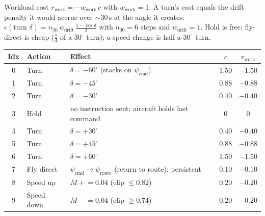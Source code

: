 \documentclass[11pt, a4paper]{article}
\begin{document}
Workload cost $r_\text{work}=-w_\text{work}\,c$ with $w_\text{work}=1$. A turn's cost equals the drift
penalty it would accrue over $\sim30$\,s at the angle it creates:
$c(\text{turn }\delta)=n_{30}\,w_\text{drift}\,\tfrac{1-\cos\delta}{2}$ with $n_{30}=6$ steps and
$w_\text{drift}=1$. Hold is free; fly-direct is cheap ($\tfrac14$ of a $30^\circ$ turn); a speed change
is half a $30^\circ$ turn.
\begin{table}[h]\centering
\begin{tabular}{cllcc}
\toprule
Idx & Action & Effect & $c$ & $r_\text{work}$\\
\midrule
0 & Turn       & $\delta=-60^\circ$ (stacks on $\psi_\text{cmd}$)              & $1.50$ & $-1.50$\\
1 & Turn       & $\delta=-45^\circ$                                            & $0.88$ & $-0.88$\\
2 & Turn       & $\delta=-30^\circ$                                            & $0.40$ & $-0.40$\\
3 & Hold       & no instruction sent; aircraft holds last command             & $0$    & $0$\\
4 & Turn       & $\delta=+30^\circ$                                            & $0.40$ & $-0.40$\\
5 & Turn       & $\delta=+45^\circ$                                            & $0.88$ & $-0.88$\\
6 & Turn       & $\delta=+60^\circ$                                            & $1.50$ & $-1.50$\\
7 & Fly direct & $\psi_\text{cmd}\!\to\!\psi_\text{route}$ (return to route); persistent & $0.10$ & $-0.10$\\
8 & Speed up   & $M\mathrel{+}=0.04$ (clip $\le0.82$)                          & $0.20$ & $-0.20$\\
9 & Speed down & $M\mathrel{-}=0.04$ (clip $\ge0.74$)                          & $0.20$ & $-0.20$\\
\bottomrule
\end{tabular}
\end{table}

\end{document}
